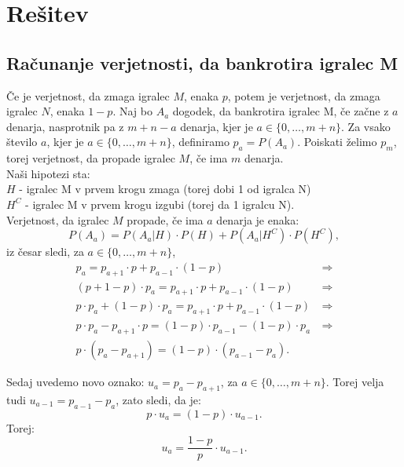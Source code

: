 \documentclass[12pt, a4paper]{article}
\begin{document}
\newpage

\section[Rešitev]{Rešitev}
\subsection{Računanje verjetnosti, da bankrotira igralec M}

Če je verjetnost, da zmaga igralec $M$, enaka $p$, potem je verjetnost, da zmaga igralec $N$, enaka $1-p$. Naj bo $A_a$ dogodek, da bankrotira igralec M, če začne z $a$ denarja, nasprotnik pa z $m + n - a$ denarja, kjer je $ a \in \{ 0, \dotso , m + n\}$. Za vsako število $a$, kjer je $ a \in \{ 0, \dotso , m + n\}$,  definiramo $p_a = P(A_a)$.
Poiskati želimo $p_m$, torej verjetnost, da propade igralec $M$, če ima $m$ denarja. 
\\

Naši hipotezi sta:
\\
$H$ - igralec M v prvem krogu zmaga (torej dobi 1 od igralca N)
\\
$H^C$ - igralec M v prvem krogu izgubi (torej da 1 igralcu N).
\\

Verjetnost, da igralec $M$ propade, če ima $a$ denarja je enaka:
\\
$$P(A_a) = P(A_a \vert  H) \cdot P(H) + P(A_a \vert  H^C) \cdot P(H^C),$$
 iz česar sledi, za $ a \in \{ 0, \dotso , m + n\}$,
\begin{equation*}
\begin{split}
p_a = p_{a+1} \cdot p + p_{a-1} \cdot (1 - p) &~ \Rightarrow \\
(p + 1 -p) \cdot p_a = p_{a+1} \cdot p + p_{a-1} \cdot (1 - p) &~ \Rightarrow \\
 p \cdot p_a + (1 - p) \cdot p_a = p_{a+1} \cdot p + p_{a-1} \cdot (1 - p) &~ \Rightarrow \\
p \cdot p_a - p_{a+1} \cdot p = (1 - p) \cdot  p_{a-1} - (1-p) \cdot p_a &~ \Rightarrow \\
p \cdot (p_a - p_{a+1}) = (1-p) \cdot (p_{a-1} - p_a). &~
\end{split}
\end{equation*}


Sedaj uvedemo novo oznako: $u_a = p_a - p_{a+1}$, za  $ a \in \{ 0, \dotso , m + n\}$. Torej velja tudi $u_{a-1} = p_{a-1} - p_a$, zato sledi, da je:
$$p \cdot u_a = (1 - p) \cdot u_{a-1}.$$
Torej: $$u_a = \frac{1-p}{p} \cdot u_{a-1}.$$
\end{document}
